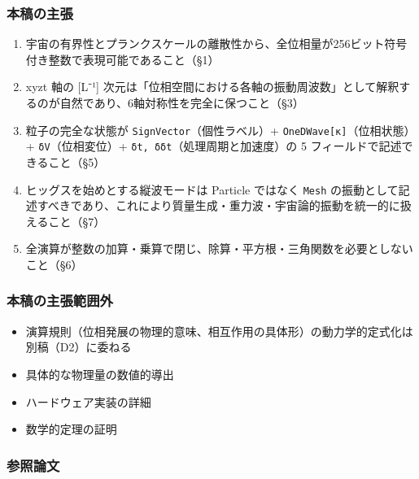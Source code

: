 \documentclass[a4paper,11pt]{ltjsarticle}
\providecommand{\tightlist}{\setlength{\itemsep}{0pt}\setlength{\parskip}{0pt}}
\begin{document}
\subsubsection{本稿の主張}\label{ux672cux7a3fux306eux4e3bux5f35}

\begin{enumerate}
\def\labelenumi{\arabic{enumi}.}
\tightlist
\item
  宇宙の有界性とプランクスケールの離散性から、全位相量が256ビット符号付き整数で表現可能であること（§1）
\item
  xyzt 軸の {[}L⁻¹{]}
  次元は「位相空間における各軸の振動周波数」として解釈するのが自然であり、6軸対称性を完全に保つこと（§3）
\item
  粒子の完全な状態が \texttt{SignVector}（個性ラベル）+
  \texttt{OneDWave{[}κ{]}}（位相状態）+ \texttt{δV}（位相変位）+
  \texttt{δt,\ δδt}（処理周期と加速度）の 5
  フィールドで記述できること（§5）
\item
  ヒッグスを始めとする縦波モードは Particle ではなく \texttt{Mesh}
  の振動として記述すべきであり、これにより質量生成・重力波・宇宙論的振動を統一的に扱えること（§7）
\item
  全演算が整数の加算・乗算で閉じ、除算・平方根・三角関数を必要としないこと（§6）
\end{enumerate}

\subsubsection{本稿の主張範囲外}\label{ux672cux7a3fux306eux4e3bux5f35ux7bc4ux56f2ux5916}

\begin{itemize}
\tightlist
\item
  演算規則（位相発展の物理的意味、相互作用の具体形）の動力学的定式化は別稿（D2）に委ねる
\item
  具体的な物理量の数値的導出
\item
  ハードウェア実装の詳細
\item
  数学的定理の証明
\end{itemize}

\subsubsection{参照論文}\label{ux53c2ux7167ux8ad6ux6587}
\end{document}
